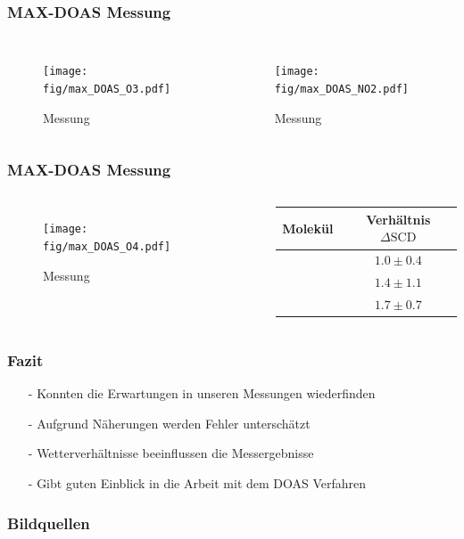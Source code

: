 \documentclass{beamer}
\begin{document}
\begin{frame}
    \frametitle{MAX-DOAS Messung}
    \begin{columns}
    	\begin{figure}
    		\texttt{[image: fig/max\_DOAS\_O3.pdf]}
    		\caption{Messung }
    	\end{figure}
	  	\begin{figure}
	  			\texttt{[image: fig/max\_DOAS\_NO2.pdf]}
	  			\caption{Messung }
	  	\end{figure}
	\end{columns}
\end{frame}

\begin{frame}
	\frametitle{MAX-DOAS Messung}
	\begin{columns}
    	\vspace{-1cm}
    	\begin{figure}
    		\texttt{[image: fig/max\_DOAS\_O4.pdf]}
    		\caption{Messung }
    	\end{figure}
		\begin{center}
			\begin{tabular*}{\linewidth}{c c}
		  		\toprule
				Molekül & Verhältnis $\Delta \text{SCD}$ \\
				\midrule
				\ch{O3} & $1.0 \pm 0.4$ \\
				\ch{NO2} & $1.4 \pm 1.1$ \\
				\ch{O4} & $1.7 \pm 0.7$\\
				\bottomrule
			\end{tabular*}
			\label{fig:ratio_dscd}
		\end{center}
	\end{columns}
\end{frame}

\begin{frame}
	\frametitle{Fazit}
	\begin{itemize}
		\item[-] Konnten die Erwartungen in unseren Messungen wiederfinden  
		\pause
		\item[-] Aufgrund Näherungen werden Fehler unterschätzt
		\pause
		\item[-] Wetterverhältnisse beeinflussen die Messergebnisse
		\pause
		\item[-] Gibt guten Einblick in die Arbeit mit dem DOAS Verfahren
	\end{itemize}
\end{frame}

\begin{frame}
	\frametitle{Bildquellen}
	\linespread{0.9}
	\printbibliography
\end{frame}
\end{document}
